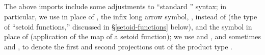 \begin{code}%
\>[0]\<%
\\
\>[0]%
\>[13]%
\>[52]\AgdaSpace{}%
\<%
\\
\>[0]%
\>[13]%
\>[52]\AgdaSpace{}%
\<%
\\
\>[0]%
\>[13]%
\>[52]\AgdaSpace{}%
\<%
\\
%
\\[\AgdaEmptyExtraSkip]%
\>[0]\AgdaSpace{}%
\<%
\\
\>[0][@{}l@{\AgdaIndent{0}}]%
\>[1]\AgdaSpace{}%
\AgdaSpace{}%
\AgdaSpace{}%
\AgdaSpace{}%
\AgdaSpace{}%
\AgdaSpace{}%
\AgdaSpace{}%
\AgdaSpace{}%
\AgdaSpace{}%
\AgdaSpace{}%
\AgdaSpace{}%
\AgdaSymbol{:}\AgdaSpace{}%
\<%
\\
%
\>[1]\AgdaSpace{}%
\AgdaSpace{}%
\AgdaSymbol{:}\AgdaSpace{}%
\AgdaSpace{}%
\<%
\\
%
\>[1]\AgdaSpace{}%
\AgdaSymbol{:}\AgdaSpace{}%
\AgdaSpace{}%
\<%
\\
\>[0]\<%
\end{code}
\fi
The above imports include some adjustments to ``standard \agda'' syntax; in particular,
we use  in place of , the infix long arrow symbol,
, instead of  (the type of ``setoid functions,'' discussed in §\ref{setoid-functions} below), and the symbol  in place of  (application of the map of a setoid function); we use
 and , and sometimes  and
, to denote the first and second
projections out of the product type
.
\ifshort\else

